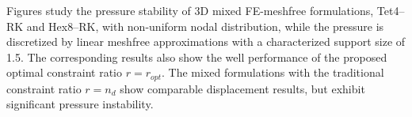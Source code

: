 Figures study the pressure stability of 3D mixed FE-meshfree formulations, Tet4--RK and Hex8--RK, with non-uniform nodal distribution, while the pressure is discretized by linear meshfree approximations with a characterized support size of 1.5. The corresponding results also show the well performance of the proposed optimal constraint ratio $r=r_{opt}$. The mixed formulations with the traditional constraint ratio $r=n_d$ show comparable displacement results, but exhibit significant pressure instability.

